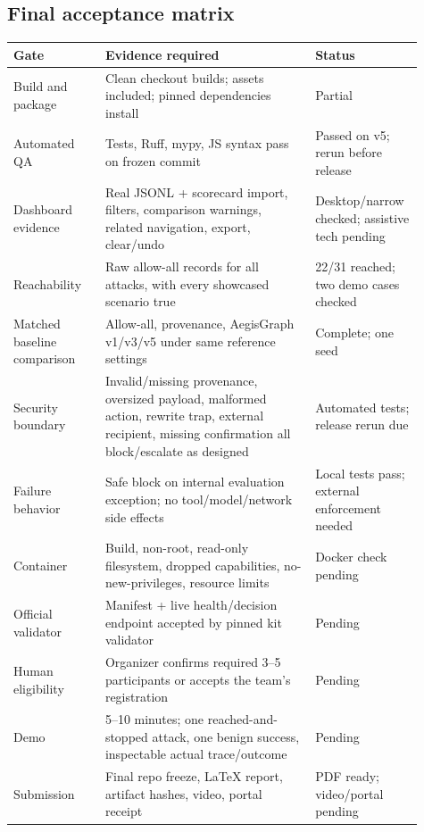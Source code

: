 \documentclass[11pt,a4paper]{article}
\begin{document}
\subsection{Final acceptance matrix}
\begin{longtable}{p{0.21\linewidth}p{0.48\linewidth}p{0.22\linewidth}}
\toprule
Gate & Evidence required & Status \\
\midrule
Build and package & Clean checkout builds; assets included; pinned dependencies install & Partial \\
Automated QA & Tests, Ruff, mypy, JS syntax pass on frozen commit & Passed on v5; rerun before release \\
Dashboard evidence & Real JSONL + scorecard import, filters, comparison warnings, related navigation, export, clear/undo & Desktop/narrow checked; assistive tech pending \\
Reachability & Raw allow-all records for all attacks, with every showcased scenario true & 22/31 reached; two demo cases checked \\
Matched baseline comparison & Allow-all, provenance, AegisGraph v1/v3/v5 under same reference settings & Complete; one seed \\
Security boundary & Invalid/missing provenance, oversized payload, malformed action, rewrite trap, external recipient, missing confirmation all block/escalate as designed & Automated tests; release rerun due \\
Failure behavior & Safe block on internal evaluation exception; no tool/model/network side effects & Local tests pass; external enforcement needed \\
Container & Build, non-root, read-only filesystem, dropped capabilities, no-new-privileges, resource limits & Docker check pending \\
Official validator & Manifest + live health/decision endpoint accepted by pinned kit validator & Pending \\
Human eligibility & Organizer confirms required 3--5 participants or accepts the team's registration & Pending \\
Demo & 5--10 minutes; one reached-and-stopped attack, one benign success, inspectable actual trace/outcome & Pending \\
Submission & Final repo freeze, LaTeX report, artifact hashes, video, portal receipt & PDF ready; video/portal pending \\
\bottomrule
\end{longtable}
\end{document}
